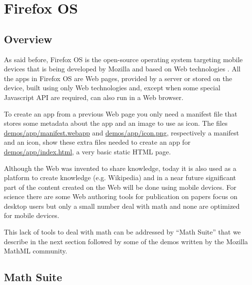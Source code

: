 \section{Firefox OS}
\label{sec:firefoxOS}

\subsection{Overview}

As said before,
Firefox OS is the open-source operating system targeting mobile devices that
is being
developed by Mozilla and based on Web technologies \cite{MozillaFirefoxOS}.
All the apps in Firefox OS
are Web pages, provided by a server or stored on the device, built using only Web
technologies and, except when
some special Javascript API are required, can also run in a Web browser.

To create an app from a previous Web page you only need a manifest
file that stores some metadata about the app and an image to use as icon. The
files
\href{http://fred-wang.github.io/MathUI2014/demos/app/manifest.webapp}{demos/app/manifest.webapp}
and
\href{http://fred-wang.github.io/MathUI2014/demos/app/icon.png}{demos/app/icon.png},
respectively a manifest and an icon,
show these extra files needed to create an app for
\href{http://fred-wang.github.io/MathUI2014/demos/app/index.html}{demos/app/index.html},
a very basic static HTML page.

Although the Web was invented to share knowledge, today it is also used
as a platform to create knowledge (e.g. Wikipedia) and in a near future
significant part of the content created on the Web will be done using mobile
devices. For science there are some Web authoring tools for publication on
papers focus on desktop users but only a small number deal with math and none
are optimized for mobile devices.

This lack of tools to deal with math can be addressed by ``Math Suite'' that
we describe in the next section followed by some of the demos written by the
Mozilla MathML community.

\subsection{Math Suite}
\label{sec:mathsuite}

